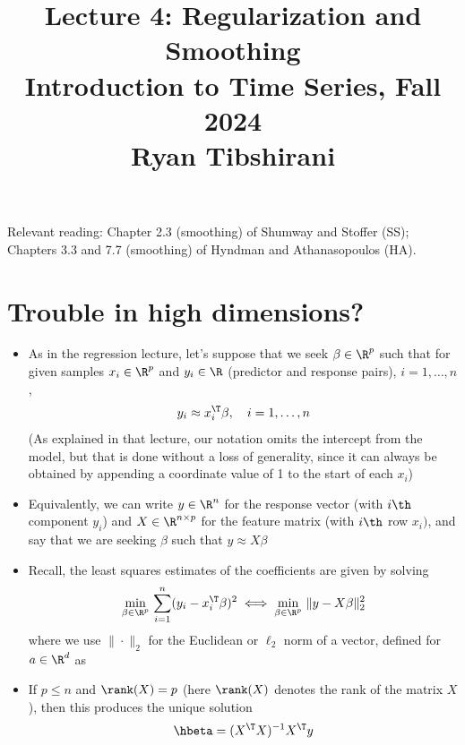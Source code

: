 \documentclass{article}
\title{Lecture 4: Regularization and Smoothing \\ \smallskip  
\large Introduction to Time Series, Fall 2024 \\ \smallskip
Ryan Tibshirani}
\date{}
\begin{document}
\maketitle
\RaggedRight
\vspace{-50pt}

Relevant reading: Chapter 2.3 (smoothing) of Shumway and Stoffer (SS); Chapters
3.3 and 7.7 (smoothing) of Hyndman and Athanasopoulos (HA).

\section{Trouble in high dimensions?} 

\def\new{\text{new}}

\begin{itemize}
\item As in the regression lecture, let's suppose that we seek $\beta \in \R^p$  
  such that for given samples $x_i \in \R^p$ and $y_i \in \R$ (predictor and
  response pairs), $i = 1,\dots,n$,    
  \[
  y_i \approx x_i^\T \beta, \quad  i = 1,\dots,n 
  \]
  (As explained in that lecture, our notation omits the intercept from the
  model, but that is done without a loss of generality, since it can always be
  obtained by appending a coordinate value of 1 to the start of each $x_i$) 

\item Equivalently, we can write $y \in \R^n$ for the response vector (with
  $i\th$ component $y_i$) and $X \in \R^{n \times p}$ for the feature matrix
  (with $i\th$ row $x_i)$, and say that we are seeking $\beta$ such that $y
  \approx X \beta$ 

\item Recall, the least squares estimates of the coefficients are given by
  solving  
  \begin{equation}
  \label{eq:ls}
  \min_{\beta \in \R^p} \, \sum_{i=1}^n (y_i - x_i^\T \beta)^2 \iff
  \min_{\beta \in \R^p} \, \|y - X \beta\|_2^2
  \end{equation}
  where we use $\|\cdot\|_2$ for the Euclidean or $\ell_2$ norm of a vector,
  defined for $a \in \R^d$ as 

\item If $p \leq n$ and $\rank(X) = p$ (here $\rank(X)$ denotes the rank of the 
  matrix $X$), then this produces the unique solution    
  \begin{equation}
  \label{eq:coef}
  \hbeta = (X^\T X)^{-1} X^\T y  
  \end{equation}


\end{itemize}
\end{document}
